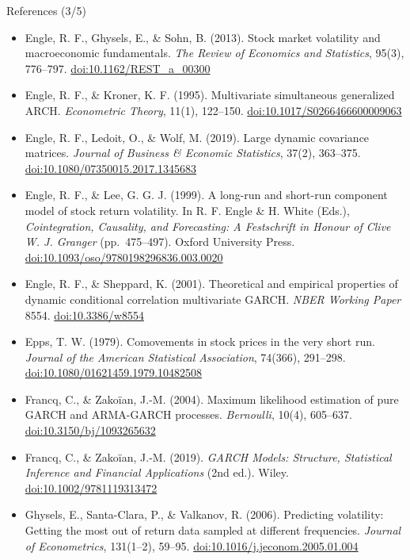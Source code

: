\begin{frame}{References (3/5)}
\itemsize{\tiny}
\begin{itemize}
    \item Engle, R. F., Ghysels, E., \& Sohn, B. (2013). Stock market volatility and macroeconomic fundamentals. \textit{The Review of Economics and Statistics}, 95(3), 776--797. \href{https://doi.org/10.1162/REST_a_00300}{doi:10.1162/REST\_a\_00300}
    \item Engle, R. F., \& Kroner, K. F. (1995). Multivariate simultaneous generalized ARCH. \textit{Econometric Theory}, 11(1), 122--150. \href{https://doi.org/10.1017/S0266466600009063}{doi:10.1017/S0266466600009063}
    \item Engle, R. F., Ledoit, O., \& Wolf, M. (2019). Large dynamic covariance matrices. \textit{Journal of Business \& Economic Statistics}, 37(2), 363--375. \href{https://doi.org/10.1080/07350015.2017.1345683}{doi:10.1080/07350015.2017.1345683}
    \item Engle, R. F., \& Lee, G. G. J. (1999). A long-run and short-run component model of stock return volatility. In R. F. Engle \& H. White (Eds.), \textit{Cointegration, Causality, and Forecasting: A Festschrift in Honour of Clive W. J. Granger} (pp.\ 475--497). Oxford University Press. \href{https://doi.org/10.1093/oso/9780198296836.003.0020}{doi:10.1093/oso/9780198296836.003.0020}
    \item Engle, R. F., \& Sheppard, K. (2001). Theoretical and empirical properties of dynamic conditional correlation multivariate GARCH. \textit{NBER Working Paper} 8554. \href{https://doi.org/10.3386/w8554}{doi:10.3386/w8554}
    \item Epps, T. W. (1979). Comovements in stock prices in the very short run. \textit{Journal of the American Statistical Association}, 74(366), 291--298. \href{https://doi.org/10.1080/01621459.1979.10482508}{doi:10.1080/01621459.1979.10482508}
    \item Francq, C., \& Zakoïan, J.-M. (2004). Maximum likelihood estimation of pure GARCH and ARMA-GARCH processes. \textit{Bernoulli}, 10(4), 605--637. \href{https://doi.org/10.3150/bj/1093265632}{doi:10.3150/bj/1093265632}
    \item Francq, C., \& Zakoïan, J.-M. (2019). \textit{GARCH Models: Structure, Statistical Inference and Financial Applications} (2nd ed.). Wiley. \href{https://doi.org/10.1002/9781119313472}{doi:10.1002/9781119313472}
    \item Ghysels, E., Santa-Clara, P., \& Valkanov, R. (2006). Predicting volatility: Getting the most out of return data sampled at different frequencies. \textit{Journal of Econometrics}, 131(1--2), 59--95. \href{https://doi.org/10.1016/j.jeconom.2005.01.004}{doi:10.1016/j.jeconom.2005.01.004}

\end{itemize}
\end{frame}
